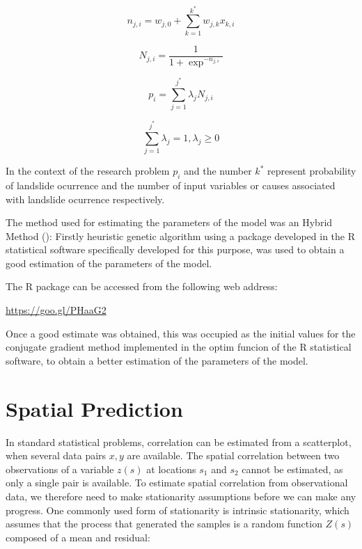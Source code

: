 \documentclass[11pt,twoside]{rmta2010esp}%
\begin{document}
\begin{equation}
n_{j,i} = w_{j,0} + \sum_{k=1}^{k^{*}} w_{j,k}x_{k,i}
\end{equation}

\begin{equation}
N_{j,i} = \frac{1}{1+\exp^{-n_{j,i}}}
\end{equation}



\begin{equation}
p_{i} = \sum_{j=1}^{j^{*}} \lambda_{j} N_{j,i}
\end{equation}

\begin{equation}
\sum_{j=1}^{j^{*}} \lambda_{j} = 1 , \lambda_{j} \ge 0
\end{equation}



In the context of the research problem $p_{i} $ and the number $ k^{*} $ represent 
probability of landslide ocurrence and the number of input variables or causes associated with landslide ocurrence respectively.

The method used for estimating the parameters of the model was an Hybrid Method (\cite{McNelis2005}): Firstly heuristic genetic algorithm using a package developed in the R statistical software specifically developed for this purpose, was used to obtain 
a good estimation of the parameters of the model. 

The R package can be accessed from the following web address:
 
\url{https://goo.gl/PHaaG2}


Once a good estimate was obtained, this was occupied as the initial values for the conjugate gradient method implemented in the optim funcion of the R statistical software, to obtain a better estimation of the parameters of the model.  


\section{Spatial Prediction}
In standard statistical problems, correlation can be estimated from a scatterplot, when several data pairs ${x, y}$ are available. The spatial correlation between two observations of a variable $z(s)$ at locations $s_{1}$ and $s_{2}$ cannot be estimated, as only a single pair is available. To estimate spatial correlation
from observational data, we therefore need to make stationarity assumptions
before we can make any progress. One commonly used form of stationarity
is intrinsic stationarity, which assumes that the process that generated the
samples is a random function $Z(s)$ composed of a mean and residual:
\end{document}
